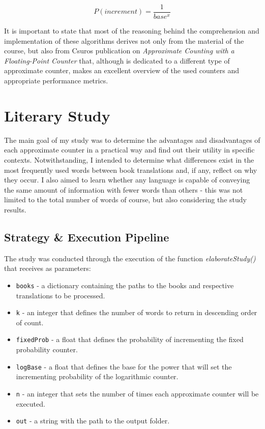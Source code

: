 \documentclass[shortpaper]{revdetua}
\begin{document}
{
    \begin{equation} \label{eq:1}
        P(increment) = \frac{1}{base^{x}}
    \end{equation}
}
\vspace{-8pt}

It is important to state that most of the reasoning behind the comprehension and
implementation of these algorithms derives not only from the material of the 
course, but also from Csuros publication on \textit{Approximate Counting with a 
Floating-Point Counter} \cite{csuros} that, although is dedicated to a different 
type of approximate counter, makes an excellent overview of the used counters 
and appropriate performance metrics.


\section{Literary Study}

The main goal of my study was to determine the advantages and disadvantages of 
each approximate counter in a practical way and find out their utility in 
specific contexts.
Notwithstanding, I intended to determine what differences exist in the most 
frequently used words between book translations and, if any, reflect on why they occur.
I also aimed to learn whether any language is capable of conveying the same amount 
of information with fewer words than others - this was not limited to the total 
number of words of course, but also considering the study results.

\subsection{Strategy \& Execution Pipeline}

The study was conducted through the execution of the function 
\textit{elaborateStudy()} that receives as parameters:

\begin{itemize}
    \item \texttt{books} - a dictionary containing the paths to the books and respective translations to be processed.
    \item \texttt{k} - an integer that defines the number of words to return in descending order of count.
    \item \texttt{fixedProb} - a float that defines the probability of incrementing the fixed probability counter.
    \item \texttt{logBase} - a float that defines the base for the power that will set the incrementing probability of the logarithmic counter.
    \item \texttt{n} - an integer that sets the number of times each approximate counter will be executed.
    \item \texttt{out} - a string with the path to the output folder.
\end{itemize}
\end{document}
